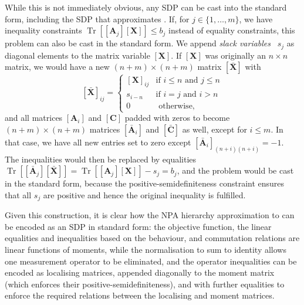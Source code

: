 \documentclass[10pt, a4paper]{article}
\numberwithin{equation}{section} %
\theoremstyle{definition}
\theoremstyle{plain}
\newcommand{\dintv}[2]{\mathopen\{#1,\ldots,#2\mathclose\}}
\newcommand{\?}{\mathrel{?}} %
\newcommand{\matr}[2][]{\left[\mathbf{#2}#1\right]} %
\newcommand{\Tr}[2][]{\mathop{\mathrm{Tr}#1}\left[ #2 \right]} %
\begin{document}
                        While this is not immediately obvious, any SDP can be cast into the standard form, including the SDP that approximates . If, for \(j\in\dintv{1}{m}\), we have inequality constraints \(\Tr{\matr[_j]{A}\matr{X}} \leq b_j\) instead of equality constraints, this problem can also be cast in the standard form. We append \emph{slack variables}~\cite[Ch. 4.1.3]{BoydVand} \(s_j\) as diagonal elements to the matrix variable \(\matr{X}\). If \(\matr{X}\) was originally an \(n\times{n}\) matrix, we would have a new \((n+m)\times{(n+m)}\) matrix \(\matr{\bar{X}}\) with
                        \begin{equation}
                          \matr{\bar{X}}_{ij} = \begin{cases}
                            \matr{X}_{ij} & \text{if } i \leq n \text{ and } j \leq n \\
                            s_{i-n} & \text{if } i = j \text{ and } i > n \\
                            0 & \text{ otherwise,}
                          \end{cases}
                        \end{equation}
                        and all matrices \(\matr[_i]{A}\) and \(\matr{C}\) padded with zeros to become \((n+m)\times(n+m)\) matrices \(\matr[_i]{\bar{A}}\) and \(\matr{\bar{C}}\) as well, except for \(i \leq m\). In that case, we have all new entries set to zero except \(\matr[_i]{\bar{A}}_{(n+i)(n+i)} = -1\). The inequalities would then be replaced by equalities \(\Tr{\matr[_j]{\bar{A}}\matr{\bar{X}}} = \Tr{\matr[_j]{A}\matr{X}} - s_j = b_j\), and the problem would be cast in the standard form, because the positive-semidefiniteness constraint ensures that all \(s_j\) are positive and hence the original inequality is fulfilled.

                        Given this construction, it is clear how the NPA hierarchy approximation to  can be encoded as an SDP in standard form: the objective function, the linear equalities and inequalities based on the behaviour, and commutation relations are linear functions of moments, while the normalisation to sum to identity allows one measurement operator to be eliminated, and the operator inequalities can be encoded as localising matrices, appended diagonally to the moment matrix (which enforces their positive-semidefiniteness), and with further equalities to enforce the required relations between the localising and moment matrices.
\end{document}

